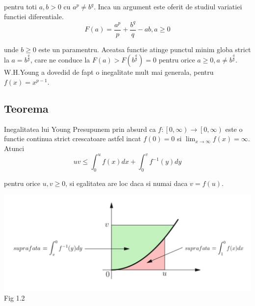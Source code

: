 \documentclass[a4paper,12pt,oneside]{report}
\begin{document}
pentru toti \(a,b>0\) cu \(a^{p}\neq b^{q}\). Inca un argument este oferit de studiul variatiei functiei diferentiale. 
\begin{displaymath}
  F\left ( a \right )= \frac{a^{p}}{p}+\frac{b^{q}}{q} - ab, a\geq 0
\end{displaymath}

unde \(b\geq 0\) este un paramentru. Aceatsa functie atinge punctul minim globa strict la \(a= b^{\frac{q}{p}}\), care ne conduce la \(F\left ( a \right )> F\left ( b^{\frac{q}{p}} \right ) = 0\) pentru orice \(a\geq 0, a\neq b^{\frac{q}{p}}\). 
	W.H.Young a dovedid de fapt  o inegalitate mult mai generala, pentru \(f\left ( x \right )=  x^{p-1}\).

\subsection{Teorema}

Inegalitatea lui Young
Presupunem prin absurd ca \(f: \left [ 0,\infty  \right ) \rightarrow \left [ 0,\infty  \right )\) este o functie continua strict crescatoare astfel incat \(f\left ( 0 \right )= 0\) si \(\lim_{x\rightarrow \infty }f\left ( x \right )= \infty\). Atunci 
\begin{displaymath}
  uv\leq \int_{0}^{u}f\left ( x \right )dx + \int_{0}^{v}f^{-1}\left ( y \right )dy
\end{displaymath}

pentru orice \(u,v\geq 0\), si egalitatea are loc daca si numai daca \( v = f\left ( u \right )\). 

\begin{center}
	\includegraphics[width=1.0\textwidth]{fig1.2.png}
	\\ Fig 1.2
\end{center}
\end{document}
